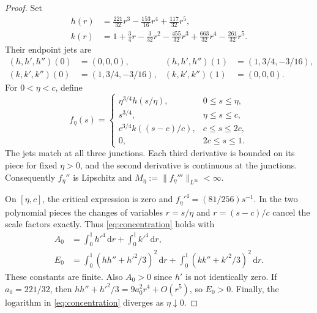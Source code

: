 \documentclass[11pt,a4paper]{article}
\newcommand{\dd}{\,\mathrm{d}}
\begin{document}
\begin{proof}
Set
\begin{align*}
 h(r)&=\frac{221}{32}r^3-\frac{153}{16}r^4+\frac{117}{32}r^5,\\
 k(r)&=1+\frac34r-\frac3{32}r^2-\frac{455}{32}r^3
             +\frac{663}{32}r^4-\frac{261}{32}r^5.
\end{align*}
Their endpoint jets are
\begin{align*}
 (h,h',h'')(0)&=(0,0,0),& (h,h',h'')(1)&=(1,3/4,-3/16),\\
 (k,k',k'')(0)&=(1,3/4,-3/16),& (k,k',k'')(1)&=(0,0,0).
\end{align*}
For $0<\eta<c$, define
\begin{equation}\label{eq:profile}
 f_\eta(s)=
 \begin{cases}
  \eta^{3/4}h(s/\eta),&0\le s\le\eta,\\
  s^{3/4},&\eta\le s\le c,\\
  c^{3/4}k((s-c)/c),&c\le s\le2c,\\
  0,&2c\le s\le1.
 \end{cases}
\end{equation}
The jets match at all three junctions. Each third derivative is bounded on
its piece for fixed $\eta>0$, and the second derivative is continuous at
the junctions. Consequently $f_\eta''$ is Lipschitz and
$M_\eta:=\|f_\eta'''\|_{L^\infty}<\infty$.

On $[\eta,c]$, the critical expression is zero and
$f_\eta'^4=(81/256)s^{-1}$. In the two polynomial pieces the changes of
variables $r=s/\eta$ and $r=(s-c)/c$ cancel the scale factors exactly.
Thus \eqref{eq:concentration} holds with
\begin{align*}
 A_0&=\int_0^1 h'^4\dd r+\int_0^1 k'^4\dd r,\\
 E_0&=\int_0^1(hh''+h'^2/3)^2\dd r
       +\int_0^1(kk''+k'^2/3)^2\dd r.
\end{align*}
These constants are finite. Also $A_0>0$ since $h'$ is not identically
zero. If $a_0=221/32$, then
$hh''+h'^2/3=9a_0^2r^4+O(r^5)$, so $E_0>0$.
Finally, the logarithm in \eqref{eq:concentration} diverges as
$\eta\downarrow0$.
\end{proof}
\end{document}

